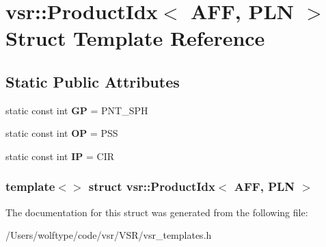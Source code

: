 \hypertarget{structvsr_1_1_product_idx_3_01_a_f_f_00_01_p_l_n_01_4}{\section{vsr\-:\-:Product\-Idx$<$ A\-F\-F, P\-L\-N $>$ Struct Template Reference}
\label{structvsr_1_1_product_idx_3_01_a_f_f_00_01_p_l_n_01_4}
}
\subsection*{Static Public Attributes}
\begin{DoxyCompactItemize}
\item 
\hypertarget{structvsr_1_1_product_idx_3_01_a_f_f_00_01_p_l_n_01_4_ac2a4f5d8e1daa4c8148edce550cfacef}{static const int {\bfseries G\-P} = P\-N\-T\-\_\-\-S\-P\-H}\label{structvsr_1_1_product_idx_3_01_a_f_f_00_01_p_l_n_01_4_ac2a4f5d8e1daa4c8148edce550cfacef}

\item 
\hypertarget{structvsr_1_1_product_idx_3_01_a_f_f_00_01_p_l_n_01_4_a410fefe2c39d3c6fbde5f4ec519c4250}{static const int {\bfseries O\-P} = P\-S\-S}\label{structvsr_1_1_product_idx_3_01_a_f_f_00_01_p_l_n_01_4_a410fefe2c39d3c6fbde5f4ec519c4250}

\item 
\hypertarget{structvsr_1_1_product_idx_3_01_a_f_f_00_01_p_l_n_01_4_a415421e4a7ae3e1faeba4c4806d4db98}{static const int {\bfseries I\-P} = C\-I\-R}\label{structvsr_1_1_product_idx_3_01_a_f_f_00_01_p_l_n_01_4_a415421e4a7ae3e1faeba4c4806d4db98}

\end{DoxyCompactItemize}
\subsubsection*{template$<$$>$ struct vsr\-::\-Product\-Idx$<$ A\-F\-F, P\-L\-N $>$}



The documentation for this struct was generated from the following file\-:\begin{DoxyCompactItemize}
\item 
/\-Users/wolftype/code/vsr/\-V\-S\-R/vsr\-\_\-templates.\-h\end{DoxyCompactItemize}
